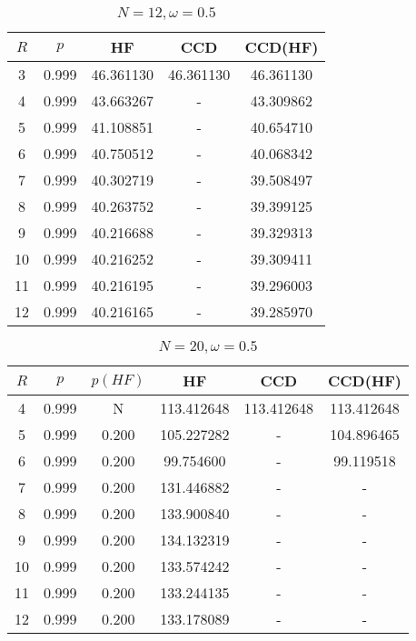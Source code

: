 \begin{table}[H]
    \centering
    \caption{$N = 12, \omega = 0.5$}
    \begin{tabular}{ccccc}
    \toprule
    $R$ & $p$ & HF & CCD & CCD(HF) \\
    \midrule
    3 & 0.999 & 46.361130 & 46.361130 & 46.361130 \\
    4 & 0.999 & 43.663267 & - & 43.309862 \\
    5 & 0.999 & 41.108851 & - & 40.654710 \\
    6 & 0.999 & 40.750512 & - & 40.068342 \\
    7 & 0.999 & 40.302719 & - & 39.508497 \\
    8 & 0.999 & 40.263752 & - & 39.399125 \\
    9 & 0.999 & 40.216688 & - & 39.329313 \\
    10 & 0.999 & 40.216252 & - & 39.309411 \\
    11 & 0.999 & 40.216195 & - & 39.296003 \\
    12 & 0.999 & 40.216165 & - & 39.285970 \\
    \bottomrule
    \end{tabular}
\end{table}

\begin{table}[H]
    \centering
    \caption{$N = 20, \omega = 0.5$}
    \begin{tabular}{cccccc}
    \toprule
    $R$ & $p$ & $p(HF)$ & HF & CCD & CCD(HF) \\
    \midrule
    4 & 0.999 & N & 113.412648 & 113.412648 & 113.412648 \\
    5 & 0.999 & 0.200 & 105.227282 & - & 104.896465 \\
    6 & 0.999 & 0.200 & 99.754600 & - & 99.119518 \\
    7 & 0.999 & 0.200 & 131.446882 & - & - \\
    8 & 0.999 & 0.200 & 133.900840 & - & - \\
    9 & 0.999 & 0.200 & 134.132319 & - & - \\
    10 & 0.999 & 0.200 & 133.574242 & - & - \\
    11 & 0.999 & 0.200 & 133.244135 & - & - \\
    12 & 0.999 & 0.200 & 133.178089 & - & - \\
    \bottomrule
    \end{tabular}
\end{table}
    